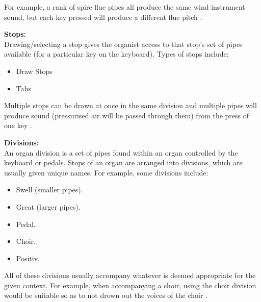For example, a rank of spire flue pipes all produce the same wind instrument sound, but each key pressed will produce a different flue pitch \cite{organvideo}. 

\noindent \textbf{Stops:}
\\ \hspace*{0.5cm}Drawing/selecting a stop gives the organist access to that stop's set of pipes available (for a particular key on the keyboard). Types of stops include:
\vspace{-0.15cm}
\begin{itemize}
    \itemsep0em 
\item Draw Stops
\vspace{-0.1cm}
\item Tabs
\end{itemize}
\vspace{-0.15cm}

Multiple stops can be drawn at once in the same division and multiple pipes will produce sound (pressurised air will be passed through them) from the press of one key \cite{organvideo}.

\noindent \textbf{Divisions:}
\\ \hspace*{0.5cm} An organ division is a set of pipes found within an organ controlled by the keyboard or pedals. Stops of an organ are arranged into divisions, which are usually given unique names. For example, some divisions include:

\vspace{-0.15cm}
\begin{itemize}
    \itemsep0em 
\item Swell (smaller pipes).
\vspace{-0.1cm}
\item Great (larger pipes).
\vspace{-0.1cm}
\item Pedal.
\vspace{-0.1cm}
\item Choir.
\vspace{-0.1cm}
\item Positiv.
\end{itemize}
\vspace{-0.15cm}

All of these divisions usually accompany whatever is deemed appropriate for the given context. For example, when accompanying a choir, using the choir division would be suitable so as to not drown out the voices of the choir \cite{organvideo}. 

